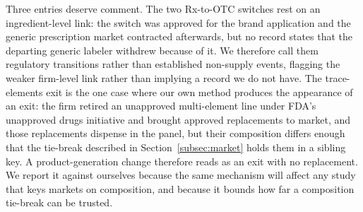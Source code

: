\documentclass[pdflatex,sn-vancouver-num,Numbered]{sn-jnl}
\begin{document}
Three entries deserve comment. The two Rx-to-OTC switches rest on an ingredient-level link: the
switch was approved for the brand application and the generic prescription market contracted
afterwards, but no record states that the departing generic labeler withdrew because of it. We
therefore call them regulatory transitions rather than established non-supply events, flagging
the weaker firm-level link rather than implying a record we do not have. The trace-elements exit
is the one case where our own method produces the appearance of an exit: the firm retired an
unapproved multi-element line under FDA's unapproved drugs initiative and brought approved
replacements to market, and those replacements dispense in the panel, but their composition
differs enough that the tie-break described in Section~\ref{subsec:market} holds them in a
sibling key. A product-generation change therefore reads as an exit with no replacement. We
report it against ourselves because the same mechanism will affect any study that keys markets
on composition, and because it bounds how far a composition tie-break can be trusted.

\begin{table}[htbp]
\caption{What the composition tie-break does at product level, for the trace-element
products. Each row is one product code in the FDA listing, with its structured active
substances and the market key the normalisation assigns it. The two four-element products
carry different substance sets and land in different keys, which is the tie-break working as
described; the five-element product is a separate market on its name. The full table for these
and for \nNdcCodes electrolyte and trace-element product codes is released as
\texttt{results/ndc\_composition\_audit.csv}, with the raw name, the route, the complete
substance string and the raw market keys. What the tie-break cannot do is measured there too, in four
mutually exclusive categories and split by panel membership: of \nNdcCombos name-and-bucket
combinations, \nNdcMulti carry two or more different populated substance sets, \nNdcMixed carries
one populated set alongside records with none, \nNdcAllMissing have none at all, and \nNdcClean
are consistent. All \nNdcOutConflicts conflicts fall among the \nNdcUnassigned product codes that
have no market in the panel; \nNdcPanelConflicts of the \nNdcAssignedGroups panel-linked groups
carry one. \nNdcMultiKey product codes resolve to more than one market
key.}\label{tab:ndc}

\end{table}
\end{document}
